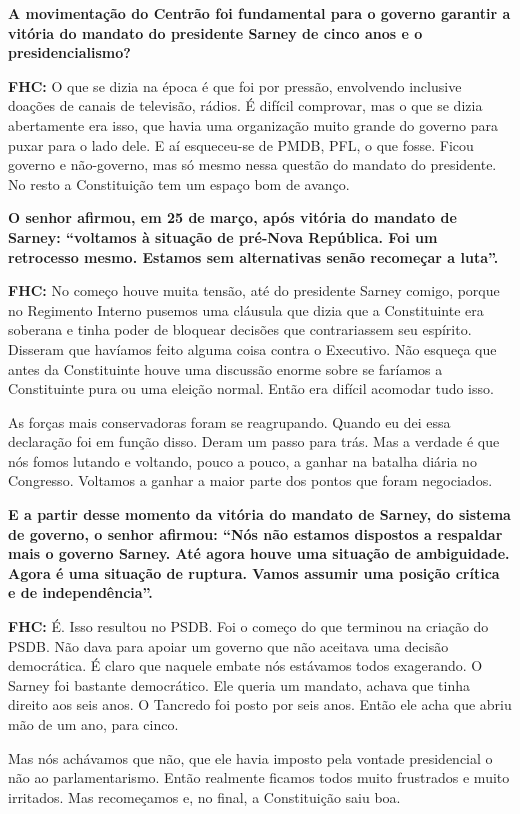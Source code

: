 \textbf{A movimentação do Centrão foi fundamental para o governo
garantir a vitória do mandato do presidente Sarney de cinco anos e o
presidencialismo?}

\textbf{FHC:} O que se dizia na época é que foi por pressão, envolvendo
inclusive doações de canais de televisão, rádios. É difícil comprovar,
mas o que se dizia abertamente era isso, que havia uma organização muito
grande do governo para puxar para o lado dele. E aí esqueceu-se de PMDB,
PFL, o que fosse. Ficou governo e não-governo, mas só mesmo nessa
questão do mandato do presidente. No resto a Constituição tem um espaço
bom de avanço.

\textbf{O senhor afirmou, em 25 de março, após vitória do mandato de
Sarney: ``voltamos à situação de pré-Nova República. Foi um retrocesso
mesmo. Estamos sem alternativas senão recomeçar a luta''.}

\textbf{FHC:} No começo houve muita tensão, até do presidente Sarney
comigo, porque no Regimento Interno pusemos uma cláusula que dizia que a
Constituinte era soberana e tinha poder de bloquear decisões que
contrariassem seu espírito. Disseram que havíamos feito alguma coisa
contra o Executivo. Não esqueça que antes da Constituinte houve uma
discussão enorme sobre se faríamos a Constituinte pura ou uma eleição
normal. Então era difícil acomodar tudo isso.

As forças mais conservadoras foram se reagrupando. Quando eu dei essa
declaração foi em função disso. Deram um passo para trás. Mas a verdade
é que nós fomos lutando e voltando, pouco a pouco, a ganhar na batalha
diária no Congresso. Voltamos a ganhar a maior parte dos pontos que
foram negociados.

\textbf{E a partir desse momento da vitória do mandato de Sarney, do
sistema de governo, o senhor afirmou: ``Nós não estamos dispostos a
respaldar mais o governo Sarney. Até agora houve uma situação de
ambiguidade. Agora é uma situação de ruptura. Vamos assumir uma posição
crítica e de independência''.}

\textbf{FHC:} É. Isso resultou no PSDB. Foi o começo do que terminou na
criação do PSDB. Não dava para apoiar um governo que não aceitava uma
decisão democrática. É claro que naquele embate nós estávamos todos
exagerando. O Sarney foi bastante democrático. Ele queria um mandato,
achava que tinha direito aos seis anos. O Tancredo foi posto por seis
anos. Então ele acha que abriu mão de um ano, para cinco.

Mas nós achávamos que não, que ele havia imposto pela vontade
presidencial o não ao parlamentarismo. Então realmente ficamos todos
muito frustrados e muito irritados. Mas recomeçamos e, no final, a
Constituição saiu boa.

